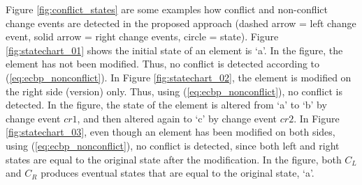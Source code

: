 Figure \ref{fig:conflict_states} are some examples how conflict and non-conflict change events are detected in the proposed approach (dashed arrow = left change event, solid arrow = right change events, circle = state). Figure \ref{fig:statechart_01} shows the initial state of an element is `a'. In the figure, the element has not been modified. Thus, no conflict is detected according to (\ref{eq:ecbp_nonconflict}). In Figure \ref{fig:statechart_02}, the element is modified on the right side (version) only. Thus, using (\ref{eq:ecbp_nonconflict}), no conflict is detected. In the figure, the state of the element is altered from `a' to `b' by change event $cr1$, and then altered again to `c' by change event $cr2$. In Figure \ref{fig:statechart_03}, even though an element has been modified on both sides, using (\ref{eq:ecbp_nonconflict}), no conflict is detected, since both left and right states are equal to the original state after the modification. In the figure, both $C_{L}$ and $C_{R}$ produces eventual states that are equal to the original state, `a'. 

